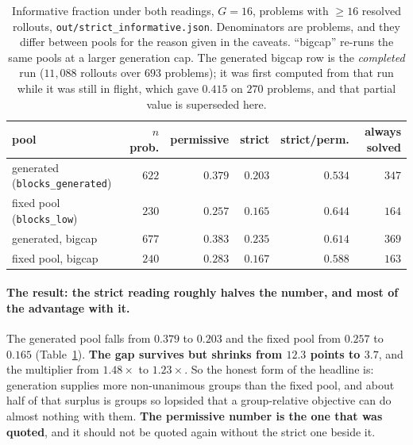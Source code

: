 \begin{table}[t]
\centering\small
\caption{Informative fraction under both readings, $G=16$, problems with $\ge 16$ resolved
rollouts, \texttt{out/strict\_informative.json}. Denominators are problems, and they differ
between pools for the reason given in the caveats. ``bigcap'' re-runs the same pools at a
larger generation cap. The generated bigcap row is the \emph{completed} run ($11{,}088$
rollouts over $693$ problems); it was first computed from that run while it was still in
flight, which gave $0.415$ on $270$ problems, and that partial value is superseded here.}
\label{tab:strictinformative}
\begin{tabular}{lrrrrr}
\toprule
pool & $n$ prob. & permissive & strict & strict/perm. & always solved \\
\midrule
generated (\texttt{blocks\_generated})        & $622$ & $\mathbf{0.379}$ & $\mathbf{0.203}$ & $0.534$ & $347$ \\
fixed pool (\texttt{blocks\_low})             & $230$ & $\mathbf{0.257}$ & $\mathbf{0.165}$ & $0.644$ & $164$ \\
\midrule
generated, bigcap                             & $677$ & $0.383$ & $0.235$ & $0.614$ & $369$ \\
fixed pool, bigcap                            & $240$ & $0.283$ & $0.167$ & $0.588$ & $163$ \\
\bottomrule
\end{tabular}
\end{table}

\paragraph{The result: the strict reading roughly halves the number, and most of the advantage
with it.} The generated pool falls from $0.379$ to $\mathbf{0.203}$ and the fixed pool from
$0.257$ to $\mathbf{0.165}$ (Table~\ref{tab:strictinformative}). \textbf{The gap survives but
shrinks from $12.3$ points to $3.7$}, and the multiplier from $1.48\times$ to $1.23\times$. So
the honest form of the headline is: generation supplies more non-unanimous groups than the
fixed pool, and about half of that surplus is groups so lopsided that a group-relative
objective can do almost nothing with them. \textbf{The permissive number is the one that was
quoted}, and it should not be quoted again without the strict one beside it.

